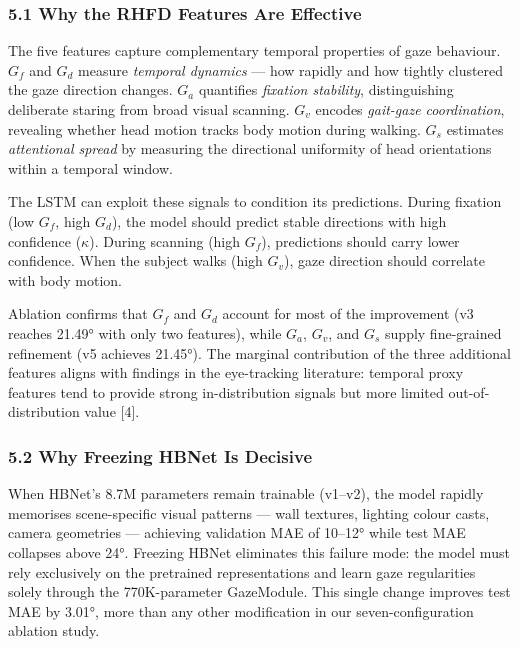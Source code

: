 \documentclass[
]{article}
\begin{document}
\hypertarget{why-the-rhfd-features-are-effective}{%
\subsubsection{5.1 Why the RHFD Features Are
Effective}\label{why-the-rhfd-features-are-effective}}

The five features capture complementary temporal properties of gaze
behaviour. \(G_f\) and \(G_d\) measure \emph{temporal dynamics} --- how
rapidly and how tightly clustered the gaze direction changes. \(G_a\)
quantifies \emph{fixation stability}, distinguishing deliberate staring
from broad visual scanning. \(G_v\) encodes \emph{gait-gaze
coordination}, revealing whether head motion tracks body motion during
walking. \(G_s\) estimates \emph{attentional spread} by measuring the
directional uniformity of head orientations within a temporal window.

The LSTM can exploit these signals to condition its predictions. During
fixation (low \(G_f\), high \(G_d\)), the model should predict stable
directions with high confidence (\(\kappa\)). During scanning (high
\(G_f\)), predictions should carry lower confidence. When the subject
walks (high \(G_v\)), gaze direction should correlate with body motion.

Ablation confirms that \(G_f\) and \(G_d\) account for most of the
improvement (v3 reaches 21.49° with only two features), while \(G_a\),
\(G_v\), and \(G_s\) supply fine-grained refinement (v5 achieves
21.45°). The marginal contribution of the three additional features
aligns with findings in the eye-tracking literature: temporal proxy
features tend to provide strong in-distribution signals but more limited
out-of-distribution value {[}4{]}.

\hypertarget{why-freezing-hbnet-is-decisive}{%
\subsubsection{5.2 Why Freezing HBNet Is
Decisive}\label{why-freezing-hbnet-is-decisive}}

When HBNet's 8.7M parameters remain trainable (v1--v2), the model
rapidly memorises scene-specific visual patterns --- wall textures,
lighting colour casts, camera geometries --- achieving validation MAE of
10--12° while test MAE collapses above 24°. Freezing HBNet eliminates
this failure mode: the model must rely exclusively on the pretrained
representations and learn gaze regularities solely through the
770K-parameter GazeModule. This single change improves test MAE by
3.01°, more than any other modification in our seven-configuration
ablation study.
\end{document}
